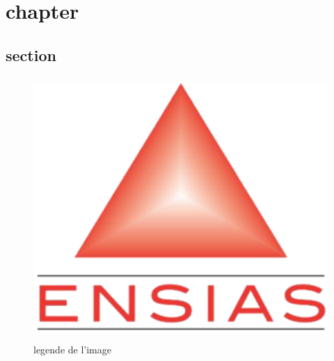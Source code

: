 



\chapter{chapter} 

\section{section }

\begin{figure}[!h]
\begin{center}
\includegraphics[height=10cm]{ensias.png}
\end{center}
\caption{legende de l'image  }
\end{figure}

